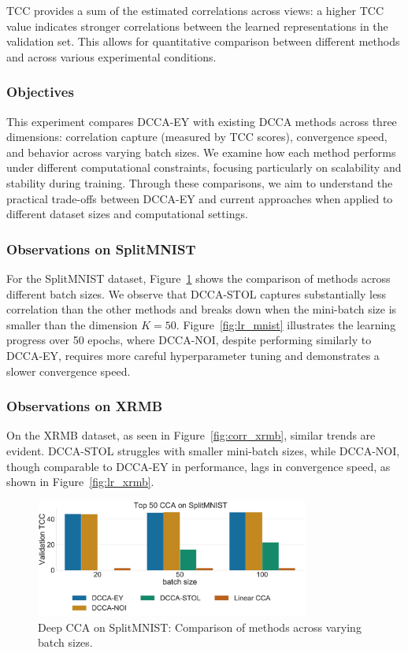 TCC provides a sum of the estimated correlations across views: a higher TCC value indicates stronger correlations between the learned representations in the validation set. This allows for quantitative comparison between different methods and across various experimental conditions.

\subsubsection{Objectives}

This experiment compares DCCA-EY with existing DCCA methods across three dimensions: correlation capture (measured by TCC scores), convergence speed, and behavior across varying batch sizes. We examine how each method performs under different computational constraints, focusing particularly on scalability and stability during training. Through these comparisons, we aim to understand the practical trade-offs between DCCA-EY and current approaches when applied to different dataset sizes and computational settings.

\subsubsection{Observations on SplitMNIST}
For the SplitMNIST dataset, Figure~\ref{fig:corr_mnist} shows the comparison of methods across different batch sizes.
We observe that DCCA-STOL captures substantially less correlation than the other methods and breaks down when the mini-batch size is smaller than the dimension $K=50$.
Figure~\ref{fig:lr_mnist} illustrates the learning progress over 50 epochs, where DCCA-NOI, despite performing similarly to DCCA-EY, requires more careful hyperparameter tuning and demonstrates a slower convergence speed.

\subsubsection{Observations on XRMB}
On the XRMB dataset, as seen in Figure~\ref{fig:corr_xrmb}, similar trends are evident.
DCCA-STOL struggles with smaller mini-batch sizes, while DCCA-NOI, though comparable to DCCA-EY in performance, lags in convergence speed, as shown in Figure~\ref{fig:lr_xrmb}.

\begin{figure}
    \centering
    \includegraphics[width=0.8\textwidth]{figures/DCCA/SplitMNIST_models_different_batch_sizes}
    \caption{Deep CCA on SplitMNIST: Comparison of methods across varying batch sizes.}
    \label{fig:corr_mnist}
\end{figure}


